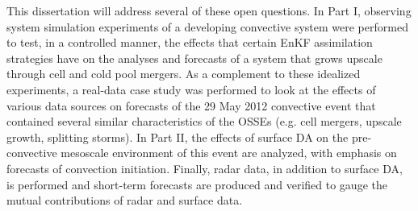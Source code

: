 This dissertation will address several of these open questions. In Part I, observing system simulation experiments of a developing convective system were performed to test, in a controlled manner, the effects that certain EnKF assimilation strategies have on the analyses and forecasts of a system that grows upscale through cell and cold pool mergers. As a complement to these idealized experiments, a real-data case study was performed to look at the effects of various data sources on forecasts of the 29 May 2012 convective event that contained several similar characteristics of the OSSEs (e.g. cell mergers, upscale growth, splitting storms). In Part II, the effects of surface DA on the pre-convective mesoscale environment of this event are analyzed, with emphasis on forecasts of convection initiation. Finally, radar data, in addition to surface DA, is performed and short-term forecasts are produced and verified to gauge the mutual contributions of radar and surface data.
